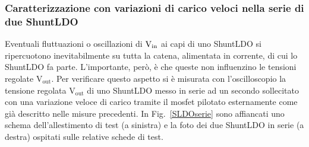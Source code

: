 
\subsubsection{Caratterizzazione con variazioni di carico veloci nella serie di due ShuntLDO}

Eventuali fluttuazioni o oscillazioni di $\mathrm{V_{in}}$ ai capi di uno ShuntLDO si ripercuotono inevitabilmente su tutta la catena, alimentata in corrente, di cui lo ShuntLDO fa parte. L'importante, per\`o, \`e che queste non influenzino le tensioni regolate $\mathrm{V_{out}}$.
Per verificare questo aspetto si è misurata con l'oscilloscopio la tensione regolata $\mathrm{V_{out}}$ di uno ShuntLDO messo in serie ad un secondo sollecitato con una variazione veloce di carico tramite il mosfet pilotato esternamente come già descritto nelle misure precedenti.
In Fig.~\ref{SLDOserie} sono affiancati uno schema dell'allestimento di test (a sinistra) e la foto dei due ShuntLDO in serie (a destra) ospitati sulle relative schede di test. 

